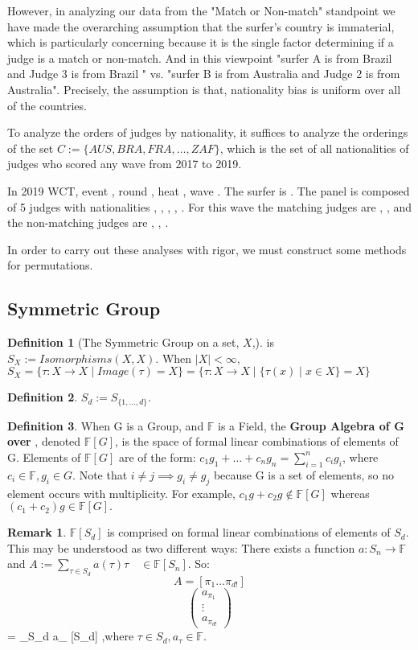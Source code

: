 \documentclass{article}
\theoremstyle{definition}
\newtheorem{definition}{Definition}
\newtheorem*{remark}{Remark}
\begin{document}
However, in analyzing our data from the "Match or Non-match" standpoint we have made the overarching assumption that the  surfer's country is immaterial, which is particularly concerning because it is the single factor determining if a judge is a match or non-match. And in this viewpoint "surfer A is from Brazil and Judge 3 is from Brazil " vs. "surfer B is from Australia and Judge 2 is from Australia". Precisely, the assumption is that, nationality bias is uniform over all of the countries. 

To analyze the orders of judges by nationality, it suffices to analyze the orderings of the set $C := \{AUS, BRA, FRA, \dots, ZAF\}$, which is the set of all nationalities of judges who scored any wave from 2017 to 2019.

In 2019 WCT, event      , round     , heat   , wave    . The surfer is     . The panel is composed of 5 judges with nationalities {  ,  ,  ,  ,  }. For this wave the matching judges are { , }, and the non-matching judges are { , , }.

In order to carry out these analyses with rigor, we must construct some methods for permutations.

\subsection{Symmetric Group}
\begin{definition}[The Symmetric Group on a set, $X$,] is $S_X := Isomorphisms(X,X)$. When $|X|<\infty$, $S_X = \{ \tau :X\rightarrow X \mid Image(\tau) = X \}  = \{\tau:X\rightarrow X \mid \{\tau(x) \mid x \in X\} = X \} $
\end{definition}
\begin{definition} $S_d := S_{\{ 1 ,\dots, d\}}. $\end{definition}

\begin{definition}When G is a Group, and $\mathbb{F}$ is a Field, the \textbf{Group Algebra of G over }, denoted $\mathbb{F}[G]$, is the space of formal linear combinations of elements of G. Elements of $\mathbb{F}[G]$ are of the form: $c_1 g_1 + \dots + c_n g_n = \sum^n_{i=1} c_i g_i$, where $c_i \in \mathbb{F}, g_i \in G$. Note that $i\neq j \implies g_i \neq g_j$ because G is a set of elements, so no element occurs with multiplicity. For example, $c_1 g + c_2 g \not\in \mathbb{F}[G]$ whereas $(c_1 + c_2)g \in \mathbb{F}[G]. $\end{definition}

\begin{remark} $\mathbb{F}[S_d]$ is comprised on formal linear combinations of elements of $S_d$. This may be understood as two different ways:
There exists a function $ a:S_n \rightarrow \mathbb{F}$ and $A :=  \sum_{\tau \in S_d} a(\tau) \tau \quad \in \mathbb{F}[S_n]$.
So: \[ A = [ \pi_1 \dots  \pi_{d!} ]  \] \[ \begin{pmatrix}a_{\pi_1}  \\  \vdots  \\  a_{\pi_{d!} }\end{pmatrix}\] = \sum_{\tau \in S_d } a_\tau \tau \in {} [S_d] \],where $\tau \in S_d, a_\tau \in \mathbb{F}$.
\end{remark}
\end{document}
